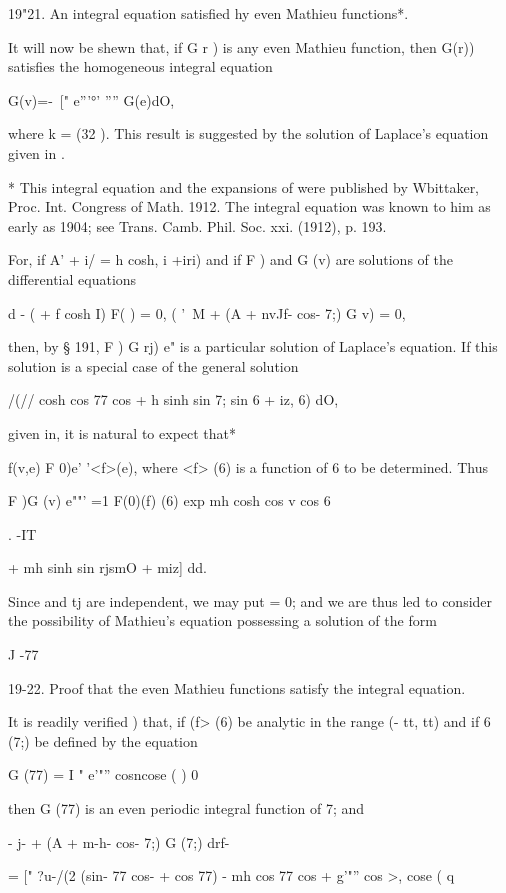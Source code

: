 19"21. An integral equation satisfied hy even Mathieu functions*.

It will now be shewn that, if G r ) is any even Mathieu function, then
G(r)) satisfies the homogeneous integral equation

G(v)=-\ [" e'''°' '''' G(e)dO,

where k = \/(32 ). This result is suggested by the solution of
Laplace's equation given in .

* This integral equation and the expansions of were published
by Wbittaker, Proc. Int. Congress of Math. 1912. The integral equation
was known to him as early as 1904; see Trans. Camb. Phil. Soc. xxi.
(1912), p. 193.

%
%

For, if A' + i/ = h cosh, i +iri) and if F ) and G (v) are solutions
of the differential equations

 d - ( + f cosh I) F( ) = 0, ( '\ M + (A + nvJf- cos- 7;) G v) = 0,

then, by § 191, F ) G rj) e" is a particular solution of Laplace's
equation. If this solution is a special case of the general solution

/(// cosh cos 77 cos + h sinh sin 7; sin 6 + iz, 6) dO,

given in, it is natural to expect that*

f(v,e) F 0)e' '<f>(e), where <f> (6) is a function of 6 to be
determined. Thus

F )G (v) e""' =1 F(0)(f) (6) exp mh cosh cos v cos 6

. -IT

+ mh sinh sin rjsmO + miz] dd.

Since and tj are independent, we may put = 0; and we are thus led to
consider the possibility of Mathieu's equation possessing a solution
of the form

J -77

19-22. Proof that the even Mathieu functions satisfy the integral
equation.

It is readily verified ) that, if (f> (6) be analytic in the
range (- tt, tt) and if 6 (7;) be defined by the equation

G (77) = I " e'"'' cosncose ( ) 0

then G (77) is an even periodic integral function of 7; and

- j- + (A + m-h- cos- 7;) G (7;) drf-

= [" ?u-/(2 (sin- 77 cos- + cos 77) - mh cos 77 cos + g'"'' cos >,
cose ( q

